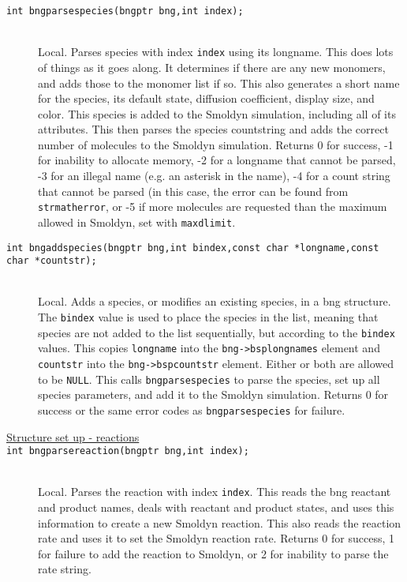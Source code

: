 \documentclass {book}
\begin{document}
\begin{description}
\item[\texttt{int bngparsespecies(bngptr bng,int index);}]
\hfill \\
Local. Parses species with index \texttt{index} using its longname. This does lots of things as it goes along. It determines if there are any new monomers, and adds those to the monomer list if so. This also generates a short name for the species, its default state, diffusion coefficient, display size, and color. This species is added to the Smoldyn simulation, including all of its attributes. This then parses the species countstring and adds the correct number of molecules to the Smoldyn simulation. Returns 0 for success, -1 for inability to allocate memory, -2 for a longname that cannot be parsed, -3 for an illegal name (e.g. an asterisk in the name), -4 for a count string that cannot be parsed (in this case, the error can be found from \texttt{strmatherror}, or -5 if more molecules are requested than the maximum allowed in Smoldyn, set with \texttt{maxdlimit}.

\item[\texttt{int bngaddspecies(bngptr bng,int bindex,const char *longname,const char *countstr);}]
\hfill \\
Local. Adds a species, or modifies an existing species, in a bng structure. The \texttt{bindex} value is used to place the species in the list, meaning that species are not added to the list sequentially, but according to the \texttt{bindex} values. This copies \texttt{longname} into the \texttt{bng->bsplongnames} element and \texttt{countstr} into the \texttt{bng->bspcountstr} element. Either or both are allowed to be \texttt{NULL}. This calls \texttt{bngparsespecies} to parse the species, set up all species parameters, and add it to the Smoldyn simulation. Returns 0 for success or the same error codes as \texttt{bngparsespecies} for failure.

\item[\underline{Structure set up - reactions}]

\item[\texttt{int bngparsereaction(bngptr bng,int index);}]
\hfill \\
Local. Parses the reaction with index \texttt{index}. This reads the bng reactant and product names, deals with reactant and product states, and uses this information to create a new Smoldyn reaction. This also reads the reaction rate and uses it to set the Smoldyn reaction rate. Returns 0 for success, 1 for failure to add the reaction to Smoldyn, or 2 for inability to parse the rate string.


\end{description}
\end{document}
